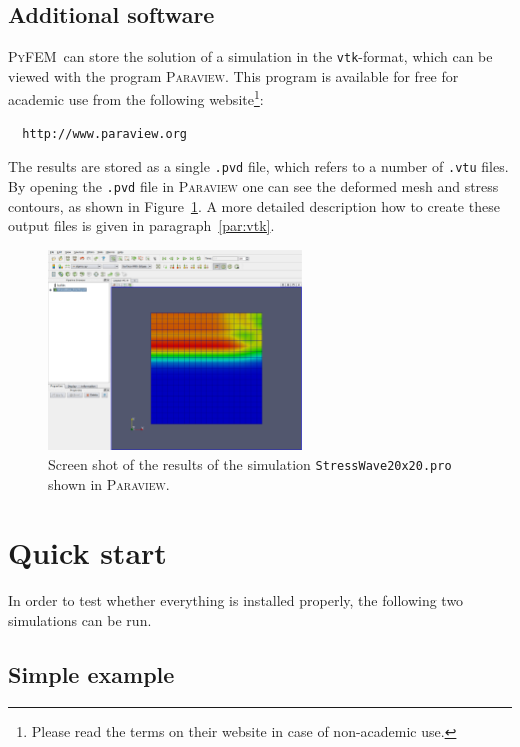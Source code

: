 \documentclass{article}
\newcommand{\progname}{\textsc{PyFEM}}
\begin{document}
\subsection{Additional software}

\progname~can store the solution of a simulation in the \texttt{vtk}-format, which can be viewed with the 
program \textsc{Paraview}. This program is available for free for academic use from the following 
website\footnote{Please read the terms on their website in case of non-academic use.}:
\begin{verbatim}
  http://www.paraview.org
\end{verbatim} 
The results are stored as a single \texttt{.pvd} file, which refers to a number of \texttt{.vtu} files. By opening
the \texttt{.pvd} file in \textsc{Paraview} one can see the deformed mesh and stress contours, as shown in 
Figure~\ref{fig:stress}. A more detailed description how to create these output files is given in paragraph~\ref{par:vtk}.

\begin{figure}
\centering\includegraphics[width=0.6\textwidth]{img/screen.eps}
\caption{Screen shot of the results of the simulation \texttt{StressWave20x20.pro} shown in \textsc{Paraview}.}
\label{fig:stress}
\end{figure}

\section{Quick start}

In order to test whether everything is installed properly, the following two simulations can be run.

\subsection*{Simple example} 
\end{document}
